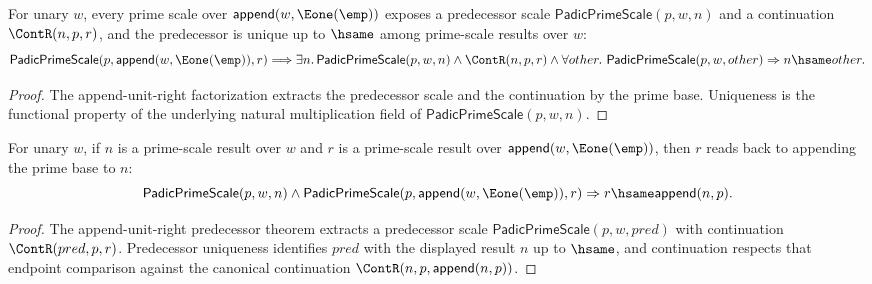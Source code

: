 \begin{theorem}
\label{thm:padic-prime-scale-append-unit-right-predecessor-unique}
For unary $w$, every prime scale over
$\mathsf{append}(w,\Eone(\emp))$ exposes a predecessor scale
$\mathsf{PadicPrimeScale}(p,w,n)$ and a continuation $\ContR(n,p,r)$, and
the predecessor is unique up to $\hsame$ among prime-scale results over $w$:
$$
\mathsf{PadicPrimeScale}(p,\mathsf{append}(w,\Eone(\emp)),r)
\Longrightarrow
\exists n.\,
\mathsf{PadicPrimeScale}(p,w,n)\land\ContR(n,p,r)\land
\forall other.\ \mathsf{PadicPrimeScale}(p,w,other)\Rightarrow n\hsame other.
$$
\end{theorem}
\begin{proof}
The append-unit-right factorization extracts the predecessor scale and the
continuation by the prime base. Uniqueness is the functional property of the
underlying natural multiplication field of $\mathsf{PadicPrimeScale}(p,w,n)$.
\end{proof}

\begin{theorem}
\label{thm:padic-prime-scale-append-unit-right-result-hsame}
For unary $w$, if $n$ is a prime-scale result over $w$ and $r$ is a prime-scale
result over $\mathsf{append}(w,\Eone(\emp))$, then $r$ reads back to appending
the prime base to $n$:
$$
\mathsf{PadicPrimeScale}(p,w,n)\land
\mathsf{PadicPrimeScale}(p,\mathsf{append}(w,\Eone(\emp)),r)
\Rightarrow
r\hsame\mathsf{append}(n,p).
$$
\end{theorem}
\begin{proof}
The append-unit-right predecessor theorem extracts a predecessor scale
$\mathsf{PadicPrimeScale}(p,w,pred)$ with continuation $\ContR(pred,p,r)$.
Predecessor uniqueness identifies $pred$ with the displayed result $n$ up to
$\hsame$, and continuation respects that endpoint comparison against the
canonical continuation $\ContR(n,p,\mathsf{append}(n,p))$.
\end{proof}

